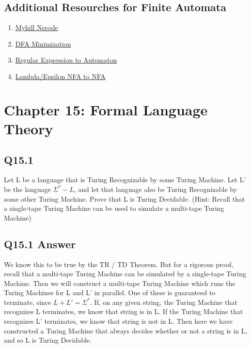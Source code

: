 \documentclass{article}
\begin{document}
\subsection*{Additional Resourches for Finite Automata}
\begin{enumerate}
    \item \href{https://www.youtube.com/watch?v=gjDPTy6fwbk}{Myhill Nerode}
    \item \href{https://www.youtube.com/watch?v=7W2lSrt8r-0&t=703s}{DFA Minimization}
    \item \href{https://www.youtube.com/watch?v=VbR1mGdP99s}{Regular Expression to Automaton}
    \item \href{https://www.youtube.com/watch?v=yXLZ9JbvEEg}{Lambda/Epsilon NFA to NFA}
\end{enumerate}
\newpage
{}
\section*{Chapter 15: Formal Language Theory}
\subsection*{Q15.1}
Let L be a language that is Turing Recognizable by some Turing Machine. Let L' be the language $\Sigma^* - L$,
and let that language also be Turing Recognizable by some other Turing Machine. Prove that L is Turing Decidable.
(Hint: Recall that a single-tape Turing Machine can be used to simulate a multi-tape Turing Machine)
\newpage
{}
\subsection*{Q15.1 Answer}
We know this to be true by the TR / TD Theorem. But for a rigorous proof, recall that a multi-tape Turing Machine can be simulated by
a single-tape Turing Machine. Then we will construct a multi-tape Turing Machine which runs the Turing Machines for L and L' in parallel. One of these
is guaranteed to terminate, since $L + L' = \Sigma^*$. If, on any given string, the Turing Machine that recognizes L terminates, 
we know that string is in L. If the Turing Machine that recognizes L' terminates, we know that string is not in L. Then here we have
constructed a Turing Machine that always decides whether or not a string is in L, and so L is Turing Decidable.
\newpage
{}
\end{document}
